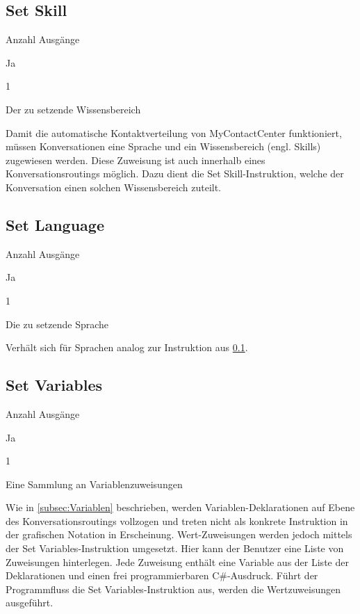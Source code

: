 \subsection{Set Skill}
\label{subsec:Set Skill}
\begin{labeling}{Anzahl Ausgänge}
\item [Eingang] Ja
\item [Anzahl Ausgänge] 1
\item [Parameter] Der zu setzende Wissensbereich
\item [Beschreibung] Damit die automatische Kontaktverteilung von MyContactCenter funktioniert, müssen Konversationen eine Sprache und ein Wissensbereich (engl. Skills) zugewiesen werden. Diese Zuweisung ist auch innerhalb eines Konversationsroutings möglich. Dazu dient die Set Skill-Instruktion, welche der Konversation einen solchen Wissensbereich zuteilt.
\end{labeling}

\subsection{Set Language}
\label{subsec:Set Language}
\begin{labeling}{Anzahl Ausgänge}
\item [Eingang] Ja
\item [Anzahl Ausgänge] 1
\item [Parameter] Die zu setzende Sprache
\item [Beschreibung] Verhält sich für Sprachen analog zur Instruktion aus \ref{subsec:Set Skill}.
\end{labeling}

\subsection{Set Variables}
\label{subsec:Set Variables}
\begin{labeling}{Anzahl Ausgänge}
\item [Eingang] Ja
\item [Anzahl Ausgänge] 1
\item [Parameter] Eine Sammlung an Variablenzuweisungen
\item [Beschreibung] Wie in \ref{subsec:Variablen} beschrieben, werden Variablen-Deklarationen auf Ebene des Konversationsroutings vollzogen und treten nicht als konkrete Instruktion in der grafischen Notation in Erscheinung. Wert-Zuweisungen werden jedoch mittels der Set Variables-Instruktion umgesetzt. Hier kann der Benutzer eine Liste von Zuweisungen hinterlegen. Jede Zuweisung enthält eine Variable aus der Liste der Deklarationen und einen frei programmierbaren C\#-Ausdruck. Führt der Programmfluss die Set Variables-Instruktion aus, werden die Wertzuweisungen ausgeführt.
\end{labeling}

